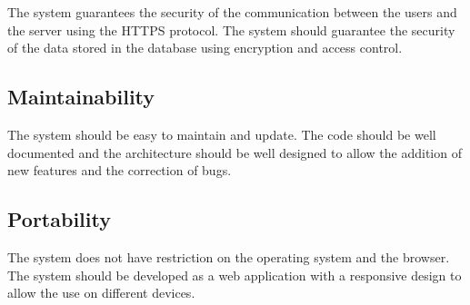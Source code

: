 The system guarantees the security of the communication between the users and the server using the HTTPS protocol. The system should guarantee the security of the data stored in the database using encryption and access control. 

\subsection{Maintainability}
\label{ss:Maintainability}%

The system should be easy to maintain and update. The code should be well documented and the architecture should be well designed to allow the addition of new features and the correction of bugs.

\subsection{Portability}
\label{ss:Portability}%

The system does not have restriction on the operating system and the browser. The system should be developed as a web application with a responsive design to allow the use on different devices.